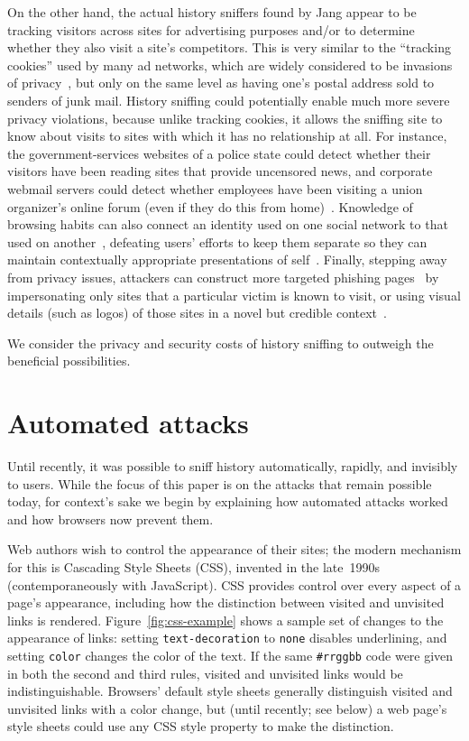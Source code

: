 \documentclass[conference]{IEEEtran}
\begin{document}
On the other hand, the actual history sniffers found by Jang appear to
be tracking visitors across sites for advertising purposes and/or to
determine whether they also visit a site's competitors.  This is very
similar to the “tracking cookies” used by many ad networks, which are
widely considered to be invasions of privacy~\cite{wpfoptout}, but
only on the same level as having one's postal address sold to senders
of junk mail.  History sniffing could potentially enable much more
severe privacy violations, because unlike tracking cookies, it allows
the sniffing site to know about visits to sites with which it has no
relationship at all.  For instance, the government-services websites
of a police state could detect whether their visitors have been
reading sites that provide uncensored news, and corporate webmail
servers could detect whether employees have been visiting a union
organizer's online forum (even if they do this from
home)~\cite{janc10wtikay}.  Knowledge of browsing habits can also
connect an identity used on one social network to that used on
another~\cite{wondracek10deanon}, defeating users' efforts to keep
them separate so they can maintain contextually appropriate
presentations of self~\cite{presentation_of_self}.  Finally, stepping
away from privacy issues, attackers can construct more targeted
phishing pages~\cite{phishing,whyphishingworks} by impersonating only
sites that a particular victim is known to visit, or using visual
details (such as logos) of those sites in a novel but credible
context~\cite{jackson06thirdpartycookies,browserrecon}.

We consider the privacy and security costs of history sniffing to
outweigh the beneficial possibilities.

\section{Automated attacks}\label{sec:autoattack}

Until recently, it was possible to sniff history automatically,
rapidly, and invisibly to users.  While the focus of this paper is on
the attacks that remain possible today, for context's sake we begin by
explaining how automated attacks worked and how browsers now prevent
them.

Web authors wish to control the appearance of their sites; the modern
mechanism for this is Cascading Style Sheets (CSS), invented in the
late~1990s (contemporaneously with JavaScript).  CSS provides control
over every aspect of a page's appearance, including how the
distinction between visited and unvisited links is rendered.
Figure~\ref{fig:css-example} shows a sample set of changes to the
appearance of links: setting \verb|text-decoration| to \verb|none|
disables underlining, and setting \verb|color| changes the color of
the text.  If the same \verb|#rrggbb| code were given in both the
second and third rules, visited and unvisited links would be
indistinguishable.  Browsers' default style sheets generally
distinguish visited and unvisited links with a color change, but
(until recently; see below) a web page's style sheets could use any
CSS style property to make the distinction.
\end{document}
